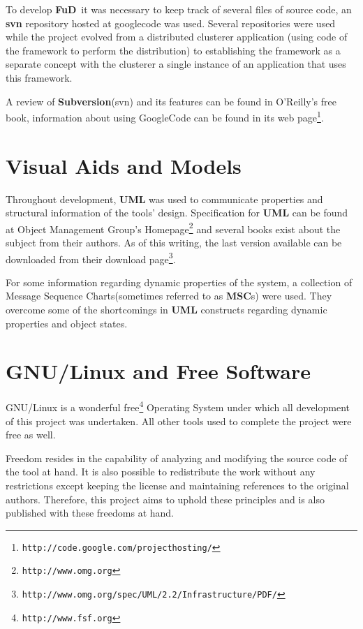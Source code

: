 \documentclass[a4paper,12pt,english]{report}
\newcommand{\fud}{\textbf{FuD}}
\begin{document}
To develop \fud \ it was necessary to keep track of several files of source code, an \textbf{svn} repository hosted at googlecode was used. Several repositories were used while the project evolved from a distributed clusterer application (using code of the framework to perform the distribution) to establishing the framework as a separate concept with the clusterer a single instance of an application that uses this framework.

A review of \textbf{Subversion}(svn) and its features can be found in O'Reilly's free book\cite{svn}, information about using GoogleCode can be found in its web page\footnote{\texttt{http://code.google.com/projecthosting/}}.

\section{Visual Aids and Models}

Throughout development, \textbf{UML} was used to communicate properties and structural information of the tools' design. Specification for \textbf{UML} can be found at Object Management Group's Homepage\footnote{\texttt{http://www.omg.org}} and several books exist about the subject from their authors\cite{uml}. As of this writing, the last version available can be downloaded from their download page\footnote{\texttt{http://www.omg.org/spec/UML/2.2/Infrastructure/PDF/}}.

For some information regarding dynamic properties of the system, a collection of Message Sequence Charts(sometimes referred to as \textbf{MSC}s) were used. They overcome some of the shortcomings in \textbf{UML} constructs regarding dynamic properties and object states.

\section{GNU/Linux and Free Software}

GNU/Linux is a wonderful free\footnote{\texttt{http://www.fsf.org}} Operating System under which all development of this project was undertaken. All other tools used to complete the project were free as well.

Freedom resides in the capability of analyzing and modifying the source code of the tool at hand. It is also possible to redistribute the work without any restrictions except keeping the license and maintaining references to the original authors. Therefore, this project aims to uphold these principles and is also published with these freedoms at hand.
\end{document}
